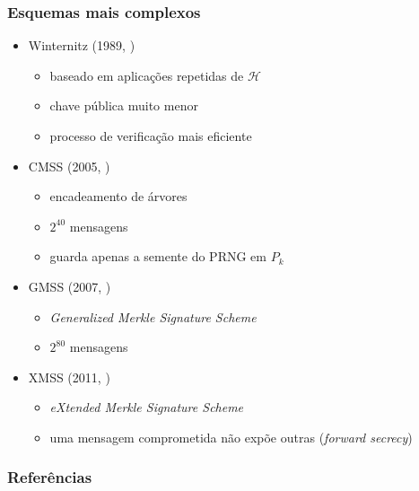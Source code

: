 \documentclass{beamer}
\begin{document}
\begin{frame}
  \frametitle{Esquemas mais complexos}
  \begin{itemize}
      \item Winternitz (1989, \cite{Dods2005})
    \begin{itemize}
      \item baseado em aplicações repetidas de $\mathcal{H}$
      \item chave pública muito menor
      \item processo de verificação mais eficiente
    \end{itemize}
    \item CMSS (2005, \cite{Buchmann2006})
    \begin{itemize}
      \item encadeamento de árvores
      \item $2^{40}$ mensagens
      \item guarda apenas a semente do PRNG em $P_{k}$
    \end{itemize}
    \item GMSS (2007, \cite{Buchmann2007})
    \begin{itemize}
      \item \emph{Generalized Merkle Signature Scheme}
      \item $2^{80}$ mensagens
    \end{itemize}
    \item XMSS (2011, \cite{Buchmann2011})
    \begin{itemize}
      \item \emph{eXtended Merkle Signature Scheme}
      \item uma mensagem comprometida não expõe outras (\emph{forward secrecy})
    \end{itemize}
  \end{itemize}
\end{frame}

\begin{frame}[allowframebreaks]
  \frametitle{Referências}
  
  
\end{frame}
\end{document}
